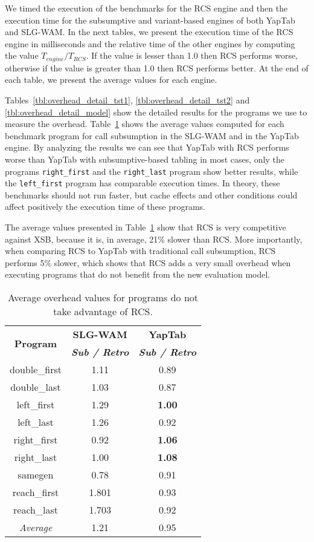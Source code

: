 We timed the execution of the benchmarks for the RCS engine and then the execution time
for the subsumptive and variant-based engines of both YapTab and SLG-WAM. In the next tables,
we present the execution time of the RCS engine in milliseconds and the relative time
of the other engines by computing the value $T_{engine} / T_{RCS}$.
If the value is lesser than 1.0 then RCS performs worse, otherwise if the value is greater than
1.0 then RCS performs better. At the end of each table, we present the average values for
each engine.

Tables~\ref{tbl:overhead_detail_tst1}, \ref{tbl:overhead_detail_tst2} and \ref{tbl:overhead_detail_model}
show the detailed results for the programs we use to measure the overhead.
Table~\ref{tbl:overhead_overview} shows the average values computed for each benchmark program
for call subsumption in the SLG-WAM and in the YapTab engine.
By analyzing the results we can see that YapTab with RCS performs worse
than YapTab with subsumptive-based tabling in most cases, only the
programs \texttt{right\_first} and the \texttt{right\_last} program show better results,
while the \texttt{left\_first} program has comparable execution times.
In theory, these benchmarks should not run faster, but cache effects and other
conditions could affect positively the execution time of these programs.

The average values presented in Table~\ref{tbl:overhead_overview} show that
RCS is very competitive against XSB, because it is, in average, 21\% slower than RCS. More
importantly, when comparing RCS to YapTab with traditional call subsumption, RCS performs 5\% slower,
which shows that RCS adds a very small overhead when executing programs that do not benefit from the
new evaluation model.

\begin{table}[ht]
\centering
  \begin{tabular}{ccc}
   \hline
    \hline
    \multirow{2}{*}{\textbf{Program}} & \textbf{SLG-WAM} & \textbf{YapTab} \\
    & \textbf{\textit{\small{Sub / Retro}}} & \textbf{\textit{\small{Sub / Retro}}} \\
   \hline
   \hline
double\_first & 1.11 & 0.89 \\
double\_last & 1.03 & 0.87 \\
left\_first & 1.29 & \textbf{1.00} \\
left\_last &  1.26  & 0.92 \\
right\_first & 0.92 & \textbf{1.06} \\
right\_last & 1.00 & \textbf{1.08} \\
samegen & 0.78 & 0.91 \\
reach\_first  &  1.801  & 0.93 \\
reach\_last  &  1.703  & 0.92 \\
\hline
\hline
\textit{Average} &  1.21 &  0.95 \\
\hline
\hline
\end{tabular}
\caption{Average overhead values for programs do not take advantage of RCS.}
\label{tbl:overhead_overview}
\end{table}


